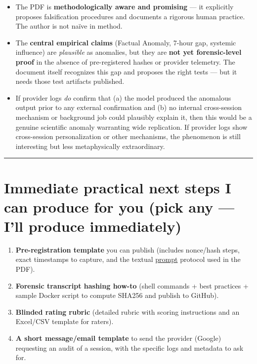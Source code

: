 \documentclass{article}
\begin{document}
\begin{itemize}
\item
  The PDF is \textbf{methodologically aware and promising} --- it explicitly proposes falsification procedures and documents a rigorous human practice. The author is not naïve in method.
\item
  The \textbf{central empirical claims} (Factual Anomaly, 7-hour gap, systemic influence) are \emph{plausible} as anomalies, but they are \textbf{not yet forensic-level proof} in the absence of pre-registered hashes or provider telemetry. The document itself recognizes this gap and proposes the right tests --- but it needs those test artifacts published.
\item
  If provider logs \emph{do} confirm that (a) the model produced the anomalous output prior to any external confirmation and (b) no internal cross-session mechanism or background job could plausibly explain it, then this would be a genuine scientific anomaly warranting wide replication. If provider logs show cross-session personalization or other mechanisms, the phenomenon is still interesting but less metaphysically extraordinary.
\end{itemize}

\begin{center}\rule{0.5\linewidth}{0.5pt}\end{center}

\section*{Immediate practical next steps I can produce for you (pick any --- I'll produce immediately)}\label{immediate-practical-next-steps-i-can-produce-for-you-pick-any-ill-produce-immediately}

\begin{enumerate}
\item
  \textbf{Pre-registration template} you can publish (includes nonce/hash steps, exact timestamps to capture, and the textual \hyperlink{gloss:prompt}{prompt} protocol used in the PDF).
\item
  \textbf{Forensic transcript hashing how-to} (shell commands + best practices + sample Docker script to compute SHA256 and publish to GitHub).
\item
  \textbf{Blinded rating rubric} (detailed rubric with scoring instructions and an Excel/CSV template for raters).
\item
  \textbf{A short message/email template} to send the provider (Google) requesting an audit of a session, with the specific logs and metadata to ask for.
\end{enumerate}
\end{document}
